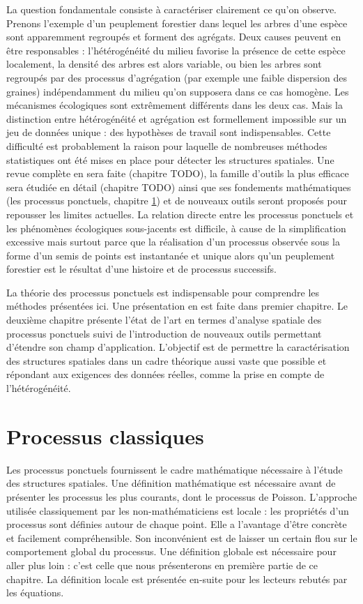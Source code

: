\documentclass[
  11pt,
  french,
  A4paper,
  extrafontsizes,onecolumn,openright
  ]{memoir}
\theoremstyle{definition}
\theoremstyle{definition}
\theoremstyle{definition}
\theoremstyle{remark}
\begin{document}
La question fondamentale consiste à caractériser clairement ce qu'on
observe. Prenons l'exemple d'un peuplement forestier dans lequel les
arbres d'une espèce sont apparemment regroupés et forment des agrégats.
Deux causes peuvent en être responsables : l'hétérogénéité du milieu
favorise la présence de cette espèce localement, la densité des arbres
est alors variable, ou bien les arbres sont regroupés par des processus
d'agrégation (par exemple une faible dispersion des graines)
indépendamment du milieu qu'on supposera dans ce cas homogène. Les
mécanismes écologiques sont extrêmement différents dans les deux cas.
Mais la distinction entre hétérogénéité et agrégation est formellement
impossible sur un jeu de données unique : des hypothèses de travail sont
indispensables. Cette difficulté est probablement la raison pour
laquelle de nombreuses méthodes statistiques ont été mises en place pour
détecter les structures spatiales. Une revue complète en sera faite
(chapitre TODO), la famille d'outils la plus efficace sera étudiée en
détail (chapitre TODO) ainsi que ses fondements mathématiques (les
processus ponctuels, chapitre \ref{Processus}) et de nouveaux outils
seront proposés pour repousser les limites actuelles. La relation
directe entre les processus ponctuels et les phénomènes écologiques
sous-jacents est difficile, à cause de la simplification excessive mais
surtout parce que la réalisation d'un processus observée sous la forme
d'un semis de points est instantanée et unique alors qu'un peuplement
forestier est le résultat d'une histoire et de processus successifs.

La théorie des processus ponctuels est indispensable pour comprendre les
méthodes présentées ici. Une présentation en est faite dans premier
chapitre. Le deuxième chapitre présente l'état de l'art en termes
d'analyse spatiale des processus ponctuels suivi de l'introduction de
nouveaux outils permettant d'étendre son champ d'application. L'objectif
est de permettre la caractérisation des structures spatiales dans un
cadre théorique aussi vaste que possible et répondant aux exigences des
données réelles, comme la prise en compte de l'hétérogénéité.

\mainmatter

\chapter{Processus classiques}\label{Processus}

Les processus ponctuels fournissent le cadre mathématique nécessaire à
l'étude des structures spatiales. Une définition mathématique est
nécessaire avant de présenter les processus les plus courants, dont le
processus de Poisson. L'approche utilisée classiquement par les
non-mathématiciens est locale : les propriétés d'un processus sont
définies autour de chaque point. Elle a l'avantage d'être concrète et
facilement compréhensible. Son inconvénient est de laisser un certain
flou sur le comportement global du processus. Une définition globale est
nécessaire pour aller plus loin : c'est celle que nous présenterons en
première partie de ce chapitre. La définition locale est présentée
en-suite pour les lecteurs rebutés par les équations.
\end{document}
